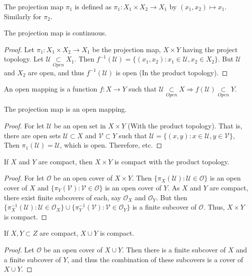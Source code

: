 \documentclass[crop=false,class=book,oneside]{standalone}
\begin{document}
            \begin{definition}
            The projection map $\pi_1$ is defined as $\pi_1:X_1\times X_2\rightarrow X_1$ by $(x_1,x_2)\mapsto x_1$. Similarly for $\pi_2$.
            \end{definition}
            \begin{theorem}
            The projection map is continuous.
            \end{theorem}
            \begin{proof}
            Let $\pi_1:X_1\times X_2\rightarrow X_1$ be the projection map, $X\times Y$ having the project topology. Let $\mathcal{U}\underset{Open}\subset X_1$. Then $f^{-1}(\mathcal{U}) = \{(x_1,x_2):x_1\in \mathcal{U}, x_2\in X_2\}$. But $\mathcal{U}$ and $X_2$ are open, and thus $f^{-1}(\mathcal{U})$ is open (In the product topology).
            \end{proof}
            \begin{definition}
            An open mapping is a function $f:X\rightarrow Y$ such that $\mathcal{U}\underset{Open}\subset X\Rightarrow f(\mathcal{U}) \underset{Open}\subset Y$.
            \end{definition}
            \begin{theorem}
            The projection map is an open mapping.
            \end{theorem}
            \begin{proof}
            For let $\mathscr{U}$ be an open set in $X\times Y$ (With the product topology). That is, there are open sets $\mathcal{U}\subset X$ and $\mathcal{V}\subset Y$ such that $\mathscr{U}= \{(x,y):x\in \mathcal{U},y\in \mathcal{V}\}$, Then $\pi_1(\mathscr{U}) =\mathcal{U}$, which is open. Therefore, etc.
            \end{proof}
            \begin{theorem}
            If $X$ and $Y$ are compact, then $X\times Y$ is compact with the product topology.
            \end{theorem}
            \begin{proof}
            For let $\mathscr{O}$ be an open cover of $X\times Y$. Then $\{\pi_X(\mathscr{U}):\mathscr{U}\in \mathscr{O}\}$ is an open cover of $X$ and $\{\pi_{Y}(\mathscr{V}):\mathscr{V}\in \mathscr{O}\}$ is an open cover of $Y$. As $X$ and $Y$ are compact, there exist finite subcovers of each, say $\mathcal{O}_X$ and $\mathcal{O}_Y$. But then $\{\pi_{X}^{-1}(\mathcal{U}):\mathcal{U}\in \mathcal{O}_X\}\cup \{\pi_{Y}^{-1}(\mathcal{V}):\mathcal{V}\in \mathcal{O}_Y\}$ is a finite subcover of $\mathscr{O}$. Thus, $X\times Y$ is compact.
            \end{proof}
            \begin{theorem}
            If $X,Y\subset Z$ are compact, $X\cup Y$ is compact.
            \end{theorem}
            \begin{proof}
            Let $\mathcal{O}$ be an open cover of $X\cup Y$. Then there is a finite subcover of $X$ and a finite subcover of $Y$, and thus the combination of these subcovers is a cover of $X\cup Y$.
            \end{proof}
\end{document}
